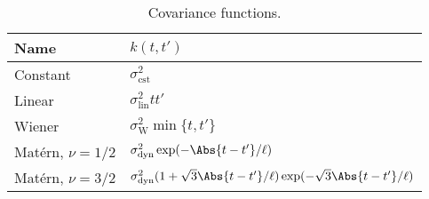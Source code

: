 \begin{table}[ht]
	\caption{
		Covariance functions.}
	\label{kks:tab:covfuncs}
	\centering
	\renewcommand{\arraystretch}{1.2}
	\begin{tabular}{l l}
		\toprule
		Name                & $k(t, t')$                                                                                     \\
		\midrule
		Constant            & $\sigma_{\text{cst}}^2$                                                                        \\
		Linear              & $\sigma_{\text{lin}}^2 t t'$                                                                   \\
		Wiener              & $\sigma_{\text{W}}^2 \min \{ t, t' \}$                                                         \\
		Matérn, $\nu = 1/2$ & $\sigma_{\text{dyn}}^2 \exp (-\Abs{t - t'} / \ell)$                                            \\
		Matérn, $\nu = 3/2$ & $\sigma_{\text{dyn}}^2 (1 +\sqrt{3} \Abs{t - t'} / \ell) \exp (-\sqrt{3} \Abs{t - t'} / \ell)$ \\
		\bottomrule
	\end{tabular}
\end{table}

